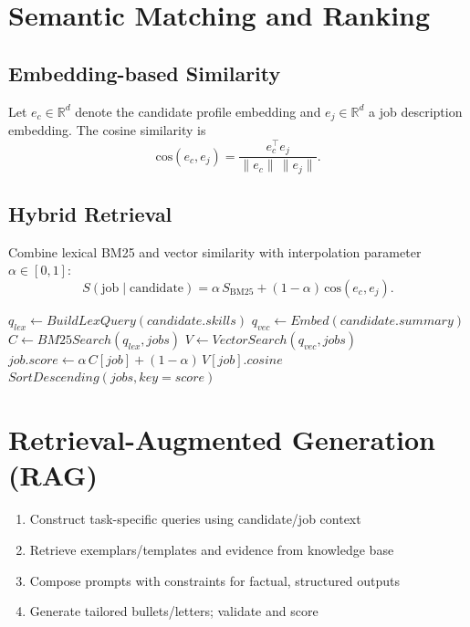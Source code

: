 \documentclass[12pt,a4paper]{report}
\begin{document}
\section{Semantic Matching and Ranking}
\subsection{Embedding-based Similarity}
Let \(e_{c} \in \mathbb{R}^{d}\) denote the candidate profile embedding and \(e_{j} \in \mathbb{R}^{d}\) a job description embedding. The cosine similarity is
\[\mathrm{cos}(e_{c}, e_{j}) = \frac{e_{c}^{\top} e_{j}}{\lVert e_{c} \rVert\, \lVert e_{j} \rVert}.\]

\subsection{Hybrid Retrieval}
Combine lexical BM25 and vector similarity with interpolation parameter \(\alpha \in [0,1]\):
\[ S(\text{job}\mid\text{candidate}) = \alpha\, S_{\mathrm{BM25}} + (1-\alpha)\, \mathrm{cos}(e_{c}, e_{j}). \]

\begin{algorithm}
\caption{Hybrid Retrieval and Ranking}
\begin{algorithmic}[1]
  \State $q_{lex} \gets BuildLexQuery(candidate.skills)$
  \State $q_{vec} \gets Embed(candidate.summary)$
  \State $C \gets BM25Search(q_{lex}, jobs)$
  \State $V \gets VectorSearch(q_{vec}, jobs)$
    \State $job.score \gets \alpha\, C[job] + (1-\alpha)\, V[job].cosine$
  \EndFor
  \State \Return $SortDescending(jobs, key=score)$
\EndProcedure
\end{algorithmic}
\end{algorithm}

\section{Retrieval-Augmented Generation (RAG)}
\begin{enumerate}[leftmargin=2em]
  \item Construct task-specific queries using candidate/job context
  \item Retrieve exemplars/templates and evidence from knowledge base
  \item Compose prompts with constraints for factual, structured outputs
  \item Generate tailored bullets/letters; validate and score
\end{enumerate}
\end{document}

